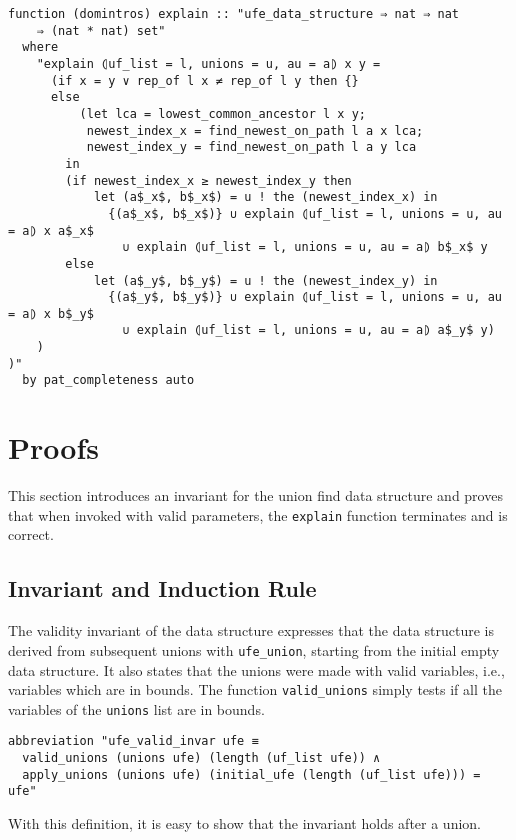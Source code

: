 \begin{lstlisting}
function (domintros) explain :: "ufe_data_structure ⇒ nat ⇒ nat
    ⇒ (nat * nat) set"
  where
    "explain ⦇uf_list = l, unions = u, au = a⦈ x y =
      (if x = y ∨ rep_of l x ≠ rep_of l y then {}
      else
          (let lca = lowest_common_ancestor l x y;
           newest_index_x = find_newest_on_path l a x lca;
           newest_index_y = find_newest_on_path l a y lca
        in
        (if newest_index_x ≥ newest_index_y then
            let (a$_x$, b$_x$) = u ! the (newest_index_x) in
              {(a$_x$, b$_x$)} ∪ explain ⦇uf_list = l, unions = u, au = a⦈ x a$_x$
                ∪ explain ⦇uf_list = l, unions = u, au = a⦈ b$_x$ y
        else
            let (a$_y$, b$_y$) = u ! the (newest_index_y) in
              {(a$_y$, b$_y$)} ∪ explain ⦇uf_list = l, unions = u, au = a⦈ x b$_y$
                ∪ explain ⦇uf_list = l, unions = u, au = a⦈ a$_y$ y)
    )
)"
  by pat_completeness auto
\end{lstlisting}



\section{Proofs}

This section introduces an invariant for the union find data structure and proves that  when invoked with valid parameters, the \lstinline{explain} function terminates and is correct.

\subsection{Invariant and Induction Rule}\label{subsection:invariant}

The validity invariant of the data structure expresses that the data structure is derived from subsequent unions with \lstinline{ufe_union}, starting from the initial empty data structure.
It also states that the unions were made with valid variables, i.e., variables which are in bounds.
The function \lstinline|valid_unions| simply tests if all the variables of the \lstinline|unions| list are in bounds.

\begin{lstlisting}
abbreviation "ufe_valid_invar ufe ≡
  valid_unions (unions ufe) (length (uf_list ufe)) ∧
  apply_unions (unions ufe) (initial_ufe (length (uf_list ufe))) = ufe"
\end{lstlisting}

With this definition, it is easy to show that the invariant holds after a union.

